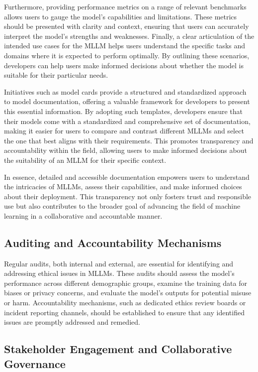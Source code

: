 Furthermore, providing performance metrics on a range of relevant benchmarks allows users to gauge the model's capabilities and limitations. These metrics should be presented with clarity and context, ensuring that users can accurately interpret the model's strengths and weaknesses. Finally, a clear articulation of the intended use cases for the MLLM helps users understand the specific tasks and domains where it is expected to perform optimally. By outlining these scenarios, developers can help users make informed decisions about whether the model is suitable for their particular needs.

Initiatives such as model cards provide a structured and standardized approach to model documentation, offering a valuable framework for developers to present this essential information. By adopting such templates, developers ensure that their models come with a standardized and comprehensive set of documentation, making it easier for users to compare and contrast different MLLMs and select the one that best aligns with their requirements. This promotes transparency and accountability within the field, allowing users to make informed decisions about the suitability of an MLLM for their specific context.

In essence, detailed and accessible documentation empowers users to understand the intricacies of MLLMs, assess their capabilities, and make informed choices about their deployment. This transparency not only fosters trust and responsible use but also contributes to the broader goal of advancing the field of machine learning in a collaborative and accountable manner.

\subsection{Auditing and Accountability Mechanisms}

Regular audits, both internal and external, are essential for identifying and addressing ethical issues in MLLMs. These audits should assess the model's performance across different demographic groups, examine the training data for biases or privacy concerns, and evaluate the model's outputs for potential misuse or harm. Accountability mechanisms, such as dedicated ethics review boards or incident reporting channels, should be established to ensure that any identified issues are promptly addressed and remedied.

\subsection{Stakeholder Engagement and Collaborative Governance}

